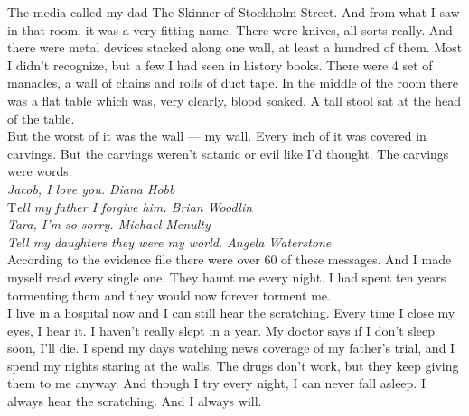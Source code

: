 \documentclass[a5paper]{scrartcl}
\begin{document}
The media called my dad The Skinner of Stockholm Street. And from what I saw in that room, it was a very fitting name. There were knives, all sorts really. And there were metal devices stacked along one wall, at least a hundred of them. Most I didn't recognize, but a few I had seen in history books. There were 4 set of manacles, a wall of chains and rolls of duct tape. In the middle of the room there was a flat table which was, very clearly, blood soaked. A tall stool sat at the head of the table.\\


But the worst of it was the wall --- my wall. Every inch of it was covered in carvings. But the carvings weren't satanic or evil like I'd thought. 
The carvings were words.\\


\textit{Jacob, I love you. Diana Hobb}
\\


T\textit{ell my father I forgive him. Brian Woodlin}
\\


\textit{Tara, I'm so sorry. Michael Mcnulty}
\\


\textit{Tell my daughters they were my world. Angela Waterstone}
\\


According to the evidence file there were over 60 of these messages. And I made myself read every single one. They haunt me every night. I had spent ten years tormenting them and they would now forever torment me.\\


I live in a hospital now and I can still hear the scratching. Every time I close my eyes, I hear it. I haven't really slept in a year. My doctor says if I don't sleep soon, I'll die. I spend my days watching news coverage of my father's trial, and I spend my nights staring at the walls. The drugs don't work, but they keep giving them to me anyway. And though I try every night, I can never fall asleep. I always hear the scratching. And I always will.
\end{document}
